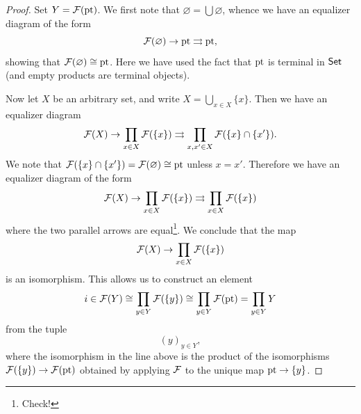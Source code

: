 \begin{proof}
    Set $Y = \cal{F}(\pt)$. We first note that $\varnothing = \bigcup \varnothing$, whence we have an equalizer diagram of the form
    \[\cal{F}(\varnothing) \to \pt \rightrightarrows \pt,\]
    showing that $\cal{F}(\varnothing) \cong \pt$. Here we have used the fact that $\pt$ is terminal in $\Set$ (and empty products are terminal objects).

    Now let $X$ be an arbitrary set, and write $X = \bigcup_{x \in X} \{x\}$. Then we have an equalizer diagram
    \[\cal{F}(X) \to \prod_{x \in X} \cal{F}(\{x\}) \rightrightarrows \prod_{x, x' \in X} \cal{F}(\{x\} \cap \{x'\}).\]
    We note that $\cal{F}(\{x\} \cap \{x'\}) = \cal{F}(\varnothing) \cong \pt$ unless $x = x'$. Therefore we have an equalizer diagram of the form
    \[\cal{F}(X) \to \prod_{x \in X} \cal{F}(\{x\}) \rightrightarrows \prod_{x \in X} \cal{F}(\{x\})\]
    where the two parallel arrows are equal\footnote{Check!}. We conclude that the map
    \[\cal{F}(X) \to \prod_{x \in X} \cal{F}(\{x\})\]
    is an isomorphism. This allows us to construct an element
    \[i \in \cal{F}(Y) \cong \prod_{y \in Y} \cal{F}(\{y\}) \cong \prod_{y \in Y} \cal{F}(\pt) = \prod_{y \in Y} Y\]
    from the tuple
    \[(y)_{y \in Y},\]
    where the isomorphism in the line above is the product of the isomorphisms $\cal{F}(\{y\}) \to \cal{F}(\pt)$ obtained by applying $\cal{F}$ to the unique map $\pt \to \{y\}$.


\end{proof}
